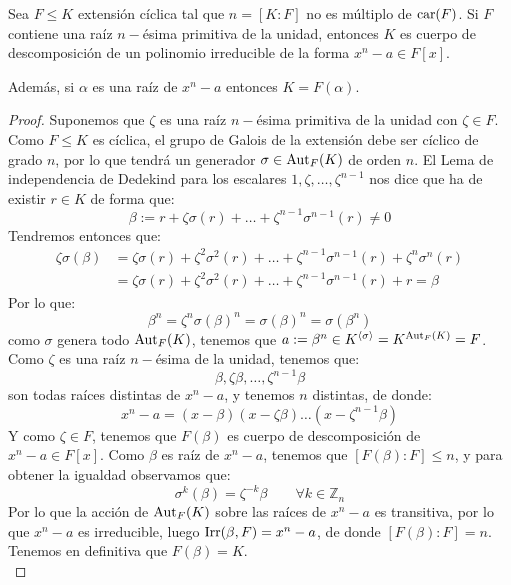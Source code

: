 \begin{teo}\label{teo:ext_ciclica}
    Sea $F\leq K$ extensión cíclica tal que $n = [K:F]$ no es múltiplo de $\operatorname{car}(F)$. Si $F$ contiene una raíz $n-$ésima primitiva de la unidad, entonces $K$ es cuerpo de descomposición de un polinomio irreducible de la forma $x^n-a\in F[x]$.

    \noindent
    Además, si $\alpha$ es una raíz de $x^n-a$ entonces $K = F(\alpha)$.
    \begin{proof}
        Suponemos que $\zeta$ es una raíz $n-$ésima primitiva de la unidad con $\zeta \in F$. Como $F\leq K$ es cíclica, el grupo de Galois de la extensión debe ser cíclico de grado $n$, por lo que tendrá un generador $\sigma\in \operatorname{Aut}_F(K)$ de orden $n$. El Lema de independencia de Dedekind para los escalares $1,\zeta,\ldots,\zeta^{n-1}$ nos dice que ha de existir $r\in K$ de forma que:
        \begin{equation*}
            \beta := r + \zeta\sigma(r) + \ldots + \zeta^{n-1}\sigma^{n-1}(r) \neq 0
        \end{equation*}
        Tendremos entonces que:
        \begin{align*}
            \zeta\sigma(\beta) &= \zeta \sigma(r) + \zeta^2 \sigma^2(r) + \ldots + \zeta^{n-1} \sigma^{n-1}(r) +  \zeta^n \sigma^n(r) \\
            &= \zeta \sigma(r) + \zeta^2 \sigma^2(r) + \ldots + \zeta^{n-1} \sigma^{n-1}(r) +  r = \beta
        \end{align*}
        Por lo que:
        \begin{equation*}
            \beta^n = \zeta^n \sigma(\beta)^n = \sigma(\beta)^n = \sigma(\beta^n)
        \end{equation*}
        como $\sigma$ genera todo $\operatorname{Aut}_F(K)$, tenemos que $a:=\beta^n\in K^{\langle \sigma \rangle } = K^{\operatorname{Aut}_F(K)} = F$. Como $\zeta$ es una raíz $n-$ésima de la unidad, tenemos que:
        \begin{equation*}
            \beta, \zeta\beta, \ldots, \zeta^{n-1}\beta
        \end{equation*}
        son todas raíces distintas de $x^n-a$, y tenemos $n$ distintas, de donde:
        \begin{equation*}
            x^n-a = (x-\beta)(x-\zeta\beta) \ldots (x-\zeta^{n-1}\beta)
        \end{equation*}
        Y como $\zeta\in F$, tenemos que $F(\beta)$ es cuerpo de descomposición de $x^n-a\in F[x]$. Como $\beta$ es raíz de $x^n-a$, tenemos que $[F(\beta):F] \leq n$, y para obtener la igualdad observamos que:
        \begin{equation*}
            \sigma^k(\beta) = \zeta^{-k}\beta \qquad \forall k\in \mathbb{Z}_n
        \end{equation*}
        Por lo que la acción de $\operatorname{Aut}_F(K)$ sobre las raíces de $x^n-a$ es transitiva, por lo que $x^n-a$ es irreducible, luego $\operatorname{Irr}(\beta,F) = x^n-a$, de donde $[F(\beta):F] = n$. Tenemos en definitiva que $F(\beta) = K$.\\


\end{proof}
\end{teo}
